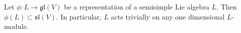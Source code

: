 Let $\phi: L \rightarrow \mathfrak{gl}(V)$ be a representation of a semisimple Lie algebra $L$. Then $\phi(L) \subset \mathfrak{sl}(V)$. In particular, $L$ acts trivially on any one dimensional $L$-module.

